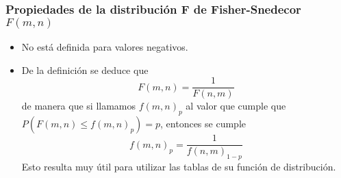 \begin{frame}
\frametitle{Propiedades de la distribución F de Fisher-Snedecor $F(m,n)$}
\begin{itemize}
\item No está definida para valores negativos.
\item De la definición se deduce que
\[
F(m,n) =\frac{1}{F(n,m)}
\]
de manera que si llamamos $f(m,n)_p$ al valor que cumple que $P(F(m,n)≤f(m,n)_p)=p$, entonces se cumple
\[                                          
f(m,n)_p =\frac{1}{f(n,m)_{1−p}}
\]
Esto resulta muy útil para utilizar las tablas de su función de distribución.
\end{itemize}

\end{frame}
